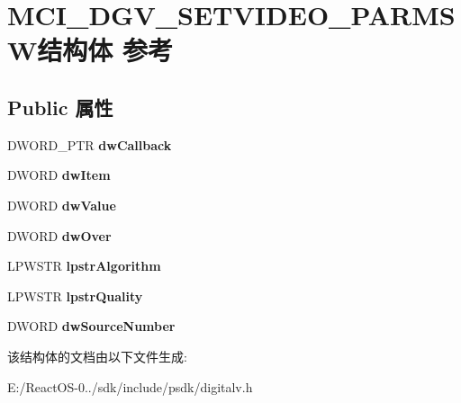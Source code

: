 \hypertarget{struct_m_c_i___d_g_v___s_e_t_v_i_d_e_o___p_a_r_m_s_w}{}\section{M\+C\+I\+\_\+\+D\+G\+V\+\_\+\+S\+E\+T\+V\+I\+D\+E\+O\+\_\+\+P\+A\+R\+M\+S\+W结构体 参考}
\label{struct_m_c_i___d_g_v___s_e_t_v_i_d_e_o___p_a_r_m_s_w}
\subsection*{Public 属性}
\begin{DoxyCompactItemize}
\item 
\mbox{\label{struct_m_c_i___d_g_v___s_e_t_v_i_d_e_o___p_a_r_m_s_w_a38215dc1d7fa149f1c2966ca6e2f3a01}} 
D\+W\+O\+R\+D\+\_\+\+P\+TR {\bfseries dw\+Callback}
\item 
\mbox{\label{struct_m_c_i___d_g_v___s_e_t_v_i_d_e_o___p_a_r_m_s_w_afd2460c1187965a695c811eb826d2314}} 
D\+W\+O\+RD {\bfseries dw\+Item}
\item 
\mbox{\label{struct_m_c_i___d_g_v___s_e_t_v_i_d_e_o___p_a_r_m_s_w_a483f9f4fbadb7522a29f1ab1b95969f3}} 
D\+W\+O\+RD {\bfseries dw\+Value}
\item 
\mbox{\label{struct_m_c_i___d_g_v___s_e_t_v_i_d_e_o___p_a_r_m_s_w_a7e839bfdb26b0325b4caec0bbd452f9f}} 
D\+W\+O\+RD {\bfseries dw\+Over}
\item 
\mbox{\label{struct_m_c_i___d_g_v___s_e_t_v_i_d_e_o___p_a_r_m_s_w_af949d7c6eeefcc7dd5863e37a403b6c1}} 
L\+P\+W\+S\+TR {\bfseries lpstr\+Algorithm}
\item 
\mbox{\label{struct_m_c_i___d_g_v___s_e_t_v_i_d_e_o___p_a_r_m_s_w_a1cd4c2cef3e8f8d3e3bc2c2f24867cc3}} 
L\+P\+W\+S\+TR {\bfseries lpstr\+Quality}
\item 
\mbox{\label{struct_m_c_i___d_g_v___s_e_t_v_i_d_e_o___p_a_r_m_s_w_a897905e55a9ef7e4d6f34f31b64dec4a}} 
D\+W\+O\+RD {\bfseries dw\+Source\+Number}
\end{DoxyCompactItemize}


该结构体的文档由以下文件生成\+:\begin{DoxyCompactItemize}
\item 
E\+:/\+React\+O\+S-\/0../sdk/include/psdk/digitalv.\+h\end{DoxyCompactItemize}

